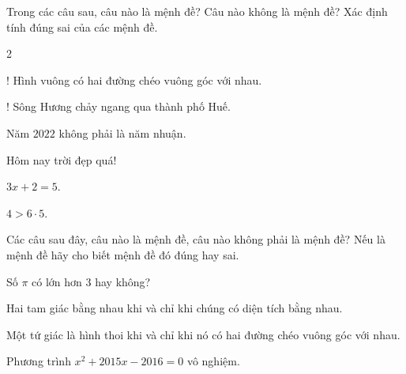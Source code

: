 \begin{bt}%
	Trong các câu sau, câu nào là mệnh đề? Câu nào không là mệnh đề? Xác định tính đúng sai của các mệnh đề.
	\begin{enumEX}{2}
		\item! Hình vuông có hai đường chéo vuông góc với nhau.
		\item! Sông Hương chảy ngang qua thành phố Huế.
		\item Năm $2022$ không phải là năm nhuận.
		\item Hôm nay trời đẹp quá!
		\item $3 x+2=5$.
		\item $4>6 \cdot 5$.
	\end{enumEX}
\end{bt}

\begin{bt}%
	Các câu sau đây, câu nào là mệnh đề, câu nào không phải là mệnh đề? Nếu là mệnh đề hãy cho biết mệnh đề đó đúng hay sai.
\begin{listEX}[1]
	\item Số $\pi $ có lớn hơn $3$ hay không?
	\item Hai tam giác bằng nhau khi và chỉ khi chúng có diện tích bằng nhau.
	\item Một tứ giác là hình thoi khi và chỉ khi nó có hai đường chéo vuông góc với nhau.
	\item Phương trình $x^2+2015x-2016=0$ vô nghiệm.
\end{listEX}
\end{bt}

